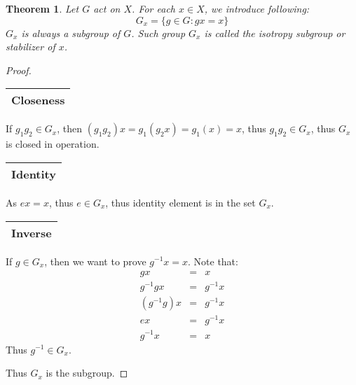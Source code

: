 \documentclass{article}
\theoremstyle{MyNonumberplain}
\theoremstyle{break}
\newtheorem*{proof}{Proof. }
\theoremstyle{break}
\newtheorem{theorem}{Theorem}[section]
\theoremstyle{break}
\theoremstyle{definition}
\theoremstyle{break}
\begin{document}
\begin{thmbox}
    \begin{theorem}
        Let $G$ act on $X$. For each $x \in X$, we introduce following:
        \[ G_x = \{ g \in G : g x = x \} \]
        $G_x$ is always a subgroup of $G$. Such group $G_x$ is called the isotropy
        subgroup or stabilizer of $x$.
    \end{theorem}
    \begin{prfbox}
        \begin{proof}
            \begin{tabular}{|c|}
                \hline
                Closeness\\
                \hline
              \end{tabular}\bigskip
              
              If $g_1 g_2 \in G_x$, then $(g_1 g_2) x = g_1 (g_2 x) = g_1 (x) = x$, thus
              $g_1 g_2 \in G_x$, thus $G_x$ is closed in operation.\bigskip
              
              \begin{tabular}{|c|}
                \hline
                Identity\\
                \hline
              \end{tabular}\bigskip
              
              As $e x = x$, thus $e \in G_x$, thus identity element is in the set $G_x$.\bigskip
              
              \begin{tabular}{|c|}
                \hline
                Inverse\\
                \hline
              \end{tabular}\bigskip
              
              If $g \in G_x$, then we want to prove $g^{- 1} x = x$. Note that:
              \begin{eqnarray*}
                g x & = & x\\
                g^{- 1} g x & = & g^{- 1} x\\
                (g^{- 1} g) x & = & g^{- 1} x\\
                e x & = & g^{- 1} x\\
                g^{- 1} x & = & x
              \end{eqnarray*}
              Thus $g^{- 1} \in G_x$.\bigskip
              
              Thus $G_x$ is the subgroup.
        \end{proof}
    \end{prfbox}
\end{thmbox}
\end{document}
